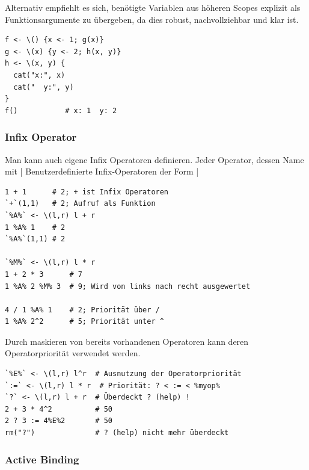 \documentclass[10pt,twocolumn]{scrartcl}
\renewcommand{\lstinline}{\mycoloredinline}
\begin{document}
Alternativ empfiehlt es sich, benötigte Variablen aus höheren Scopes
explizit als Funktionsargumente zu übergeben, da dies robust,
nachvollziehbar und klar ist.

\begin{lstlisting}
f <- \() {x <- 1; g(x)}
g <- \(x) {y <- 2; h(x, y)}
h <- \(x, y) {
  cat("x:", x)
  cat("  y:", y)
}
f()           # x: 1  y: 2
\end{lstlisting}


\subsubsection{Infix Operator}

Man kann auch eigene Infix Operatoren definieren. Jeder Operator, dessen Name mit \lstinline|%| beginnt und endet (z.~B. \lstinline|%myop%|), wird als Infix-Operator behandelt und hat in der Regel zwei Argumente.
Benutzerdefinierte Infix-Operatoren der Form \lstinline|%myop%| haben dieselbe Priorität und Assoziativität (links nach rechts) wie die speziellen built-in Operatoren \lstinline|%%|, \lstinline|%/%| oder \lstinline|%in%|. Sie liegen in der Operator-Hierarchie über \lstinline|*| und \lstinline|/|, aber unter dem Sequence-Operator \lstinline|:| (siehe ?Syntax).

\begin{lstlisting}
1 + 1      # 2; + ist Infix Operatoren
`+`(1,1)   # 2; Aufruf als Funktion
`%A%` <- \(l,r) l + r
1 %A% 1    # 2
`%A%`(1,1) # 2

`%M%` <- \(l,r) l * r
1 + 2 * 3      # 7
1 %A% 2 %M% 3  # 9; Wird von links nach recht ausgewertet

4 / 1 %A% 1    # 2; Priorität über /
1 %A% 2^2      # 5; Priorität unter ^
\end{lstlisting}

Durch maskieren von bereits vorhandenen Operatoren kann deren Operatorpriorität verwendet werden.

\begin{lstlisting}
`%E%` <- \(l,r) l^r  # Ausnutzung der Operatorpriorität
`:=` <- \(l,r) l * r  # Priorität: ? < := < %myop%
`?` <- \(l,r) l + r  # Überdeckt ? (help) !
2 + 3 * 4^2          # 50
2 ? 3 := 4%E%2       # 50
rm("?")              # ? (help) nicht mehr überdeckt
\end{lstlisting}


\subsubsection{Active Binding}
\end{document}
